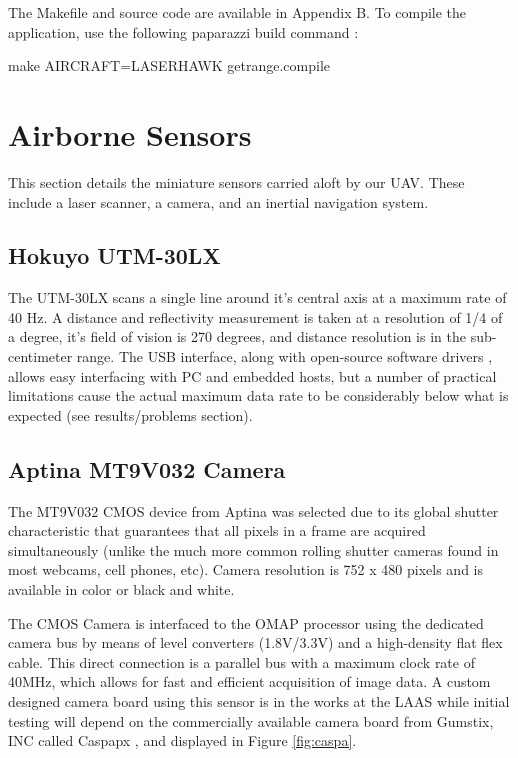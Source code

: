 \documentclass[a4paper,11pt]{report}
\begin{document}
The Makefile and source code are available in Appendix B. To compile the application, use the following paparazzi build command : 

make AIRCRAFT=LASERHAWK getrange.compile

\section{Airborne Sensors}

This section details the miniature sensors carried aloft by our UAV. These include a laser scanner, a camera, and an inertial navigation system.

\subsection{Hokuyo UTM-30LX}
\label{Hokuyo}

The UTM-30LX scans a single line around it's central axis at a maximum rate of 40 Hz. A distance and reflectivity measurement is taken at a resolution of 1/4 of a degree, it's field of vision is 270 degrees, and distance resolution is in the sub-centimeter range. The USB interface, along with open-source software drivers \cite{robotpkg}, allows easy interfacing with PC and embedded hosts, but a number of practical limitations cause the actual maximum data rate to be considerably below what is expected (see results/problems section).

\subsection{Aptina MT9V032 Camera}
\label{caspa}

The MT9V032 CMOS device from Aptina was selected due to its global shutter characteristic that guarantees that all pixels in a frame are acquired simultaneously (unlike the much more common rolling shutter cameras found in most webcams, cell phones, etc). Camera resolution is 752 x 480 pixels and is available in color or black and white. 

The CMOS Camera is interfaced to the OMAP processor using the dedicated camera bus by means of level converters (1.8V/3.3V) and a high-density flat flex cable. This direct connection is a parallel bus with a maximum clock rate of 40MHz, which allows for fast and efficient acquisition of image data. A custom designed camera board using this sensor is in the works at the LAAS while initial testing will depend on the commercially available camera board from Gumstix, INC called Caspapx \cite{caspa}, and displayed in Figure \ref{fig:caspa}.
\end{document}
